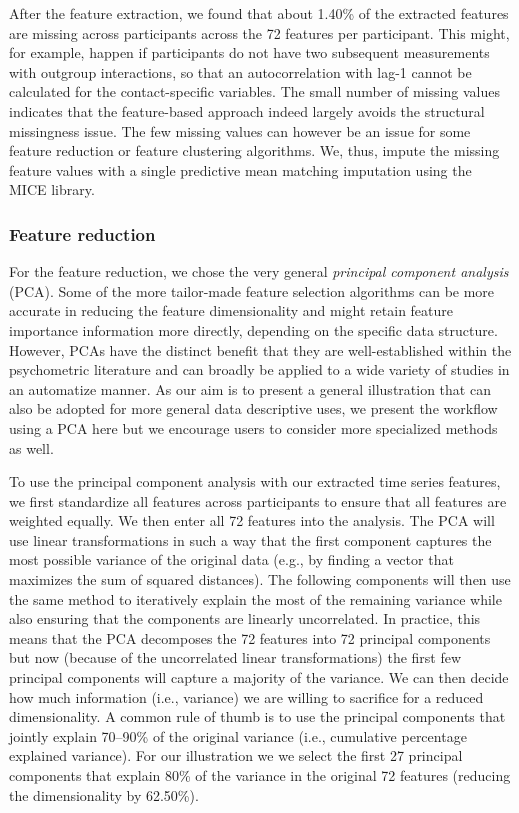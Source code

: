 After the feature extraction, we found that about 1.40\% of the
extracted features are missing across participants across the 72
features per participant. This might, for example, happen if
participants do not have two subsequent measurements with outgroup
interactions, so that an autocorrelation with lag-1 cannot be calculated
for the contact-specific variables. The small number of missing values
indicates that the feature-based approach indeed largely avoids the
structural missingness issue. The few missing values can however be an
issue for some feature reduction or feature clustering algorithms. We,
thus, impute the missing feature values with a single predictive mean
matching imputation using the MICE library.

\subsubsection{Feature reduction}

For the feature reduction, we chose the very general
\textit{principal component analysis} (PCA). Some of the more
tailor-made feature selection algorithms can be more accurate in
reducing the feature dimensionality and might retain feature importance
information more directly, depending on the specific data structure.
However, PCAs have the distinct benefit that they are well-established
within the psychometric literature and can broadly be applied to a wide
variety of studies in an automatize manner. As our aim is to present a
general illustration that can also be adopted for more general data
descriptive uses, we present the workflow using a PCA here but we
encourage users to consider more specialized methods as well.

To use the principal component analysis with our extracted time series
features, we first standardize all features across participants to
ensure that all features are weighted equally. We then enter all 72
features into the analysis. The PCA will use linear transformations in
such a way that the first component captures the most possible variance
of the original data (e.g., by finding a vector that maximizes the sum
of squared distances). The following components will then use the same
method to iteratively explain the most of the remaining variance while
also ensuring that the components are linearly uncorrelated. In
practice, this means that the PCA decomposes the 72 features into 72
principal components but now (because of the uncorrelated linear
transformations) the first few principal components will capture a
majority of the variance. We can then decide how much information (i.e.,
variance) we are willing to sacrifice for a reduced dimensionality. A
common rule of thumb is to use the principal components that jointly
explain 70--90\% of the original variance (i.e., cumulative percentage
explained variance). For our illustration we we select the first 27
principal components that explain 80\% of the variance in the original
72 features (reducing the dimensionality by 62.50\%).

